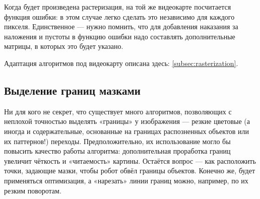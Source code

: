 Когда будет произведена растеризация, на той же видеокарте посчитается функция ошибки: в этом случае легко сделать это независимо для каждого пикселя.
Единственное — нужно помнить, что для добавления наказания за наложения и пустоты в функцию ошибки надо составлять дополнительные матрицы, в которых это будет указано.


Адаптация алгоритмов под видеокарту описана здесь: \ref{subsec:rasterization}.

\subsection{Выделение границ мазками}
Ни для кого не секрет, что существует много алгоритмов, позволяющих с неплохой точностью выделять «границы» у изображения —
резкие цветовые (а иногда и содержательные, основанные на границах распозненных объектов или их паттернов!) переходы.
Предположительно, их использование могло бы повысить качество работы алгоритма: дополнительная проработка границ увеличит чёткость
и «читаемость» картины.
Остаётся вопрос — как расположить точки, задающие мазки, чтобы робот обвёл границы объектов.
Конечно же, будет применяться оптимизация, а «нарезать» линии границ можно, например, по их резким поворотам.
